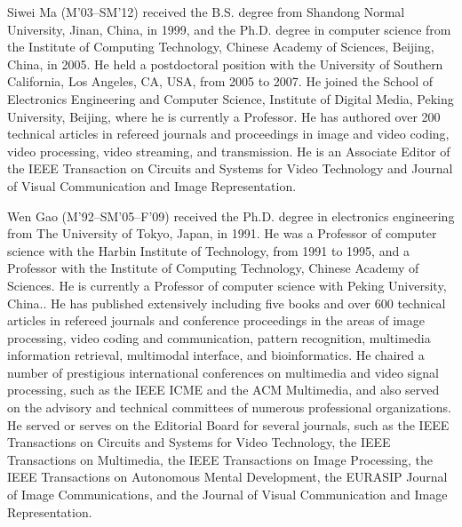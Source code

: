 \documentclass[journal]{IEEEtran}
\begin{document}
\begin{IEEEbiography}{Siwei Ma}
(M’03–SM’12) received the B.S. degree from Shandong Normal University, Jinan, China, in 1999, and the Ph.D. degree in computer science from the Institute of Computing Technology, Chinese Academy of Sciences, Beijing, China, in 2005. He held a postdoctoral position with the University of Southern California, Los Angeles, CA, USA, from 2005 to 2007. He joined the School of Electronics Engineering and Computer Science, Institute of Digital Media, Peking University, Beijing, where he is currently a Professor. He has authored over 200 technical articles in refereed journals and proceedings in image and video coding, video processing, video streaming, and transmission. He is an Associate Editor of the IEEE Transaction on Circuits and Systems for Video Technology and Journal of Visual Communication and Image Representation.
\end{IEEEbiography}
\begin{IEEEbiography}{Wen Gao}
(M’92–SM’05–F’09) received the Ph.D. degree in electronics engineering from The University of Tokyo, Japan, in 1991. He was a Professor of computer science with the Harbin Institute of Technology, from 1991 to 1995, and a Professor with the Institute of Computing Technology, Chinese Academy of Sciences. He is currently a Professor of computer science with Peking University, China.. He has published extensively including five books and over 600 technical articles in refereed journals and conference proceedings in the areas of image processing, video coding and communication, pattern recognition, multimedia information retrieval, multimodal interface, and bioinformatics. He chaired a number of prestigious international conferences on multimedia and video signal processing, such as the IEEE ICME and the ACM Multimedia, and also served on the advisory and technical committees of numerous professional organizations. He served or serves on the Editorial Board for several journals, such as the IEEE Transactions on Circuits and Systems for Video Technology, the IEEE Transactions on Multimedia, the IEEE Transactions on Image Processing, the IEEE Transactions on Autonomous Mental Development, the EURASIP Journal of Image Communications, and the Journal of Visual Communication and Image Representation.
\end{IEEEbiography}
\end{document}
